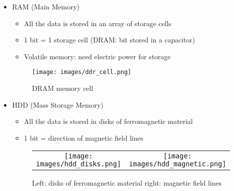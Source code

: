 \documentclass[handout]{beamer}[10pt, usepdftitle=false]
\begin{document}
	\begin{frame}    
    
   	\begin{itemize}
   	
	\item {RAM (Main Memory)
		\begin{itemize}
			\item {All the data is stored in an array of storage cells}
			\item {1 bit = 1 storage cell (DRAM: bit stored in a capacitor)}
			\item {Volatile memory: need electric power for storage}
		\end{itemize}
		\begin{figure}[t]
		\texttt{[image: images/ddr\_cell.png]}
		\vspace*{-0.9em}
		\caption{DRAM memory cell}
		\centering
		\end{figure}
		}
	\item {HDD (Mass Storage Memory)
		\begin{itemize}
			\item {All the data is stored in disks of ferromagnetic material}
			\item {1 bit = direction of magnetic field lines}			
		\end{itemize}			
				
		\begin{figure}
		\begin{tabular}{cc}
		\texttt{[image: images/hdd\_disks.png]} &	
		\texttt{[image: images/hdd\_magnetic.png]} \\
		\end{tabular}
		\vspace*{-0.5em}
		\caption{Left: disks of ferromagnetic material right: magnetic field lines}
		\end{figure}		
	}						
	
	\end{itemize}
	
	
		   
    \end{frame}
    	
\end{document}
